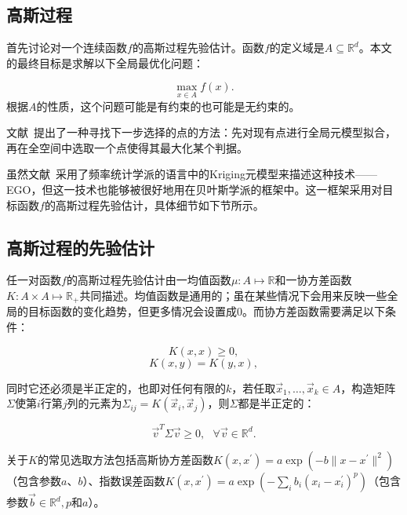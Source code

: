 \documentclass[index]{subfiles}
\begin{document}
\subsection{高斯过程}

首先讨论对一个连续函数$f$的高斯过程先验估计。函数$f$的定义域是$A \subseteq \mathbb{R}^{d}$。本文的最终目标是求解以下全局最优化问题：

\begin{equation}
\max_{x \in A} f(x).
\end{equation}
根据$A$的性质，这个问题可能是有约束的也可能是无约束的。

文献~提出了一种寻找下一步选择的点的方法：先对现有点进行全局元模型拟合，再在全空间中选取一个点使得其最大化某个判据。

虽然文献~采用了频率统计学派的语言中的Kriging元模型来描述这种技术——EGO，但这一技术也能够被很好地用在贝叶斯学派的框架中。这一框架采用对目标函数$f$的高斯过程先验估计，具体细节如下节所示。

\subsection{高斯过程的先验估计}

任一对函数$f$的高斯过程先验估计由一均值函数$\mu : A \mapsto \mathbb{R}$和一协方差函数$K : A \times A \mapsto \mathbb{R}_{+}$共同描述。均值函数是通用的；虽在某些情况下会用来反映一些全局的目标函数的变化趋势，但更多情况会设置成0。而协方差函数需要满足以下条件：

\begin{equation}K(x,x) \geq 0,\end{equation}
\begin{equation}K(x,y) = K(y,x),\end{equation}

同时它还必须是半正定的，也即对任何有限的$k$，若任取$\vec{x}_{1}, \ldots, \vec{x}_{k} \in A$，构造矩阵$\Sigma$使第$i$行第$j$列的元素为$\Sigma_{ij} = K(\vec{x}_{i}, \vec{x}_{j})$，则$\Sigma$都是半正定的：

\begin{equation}\vec{v}^{T}\Sigma \vec{v} \geq 0, \ \ \ \forall \vec{v} \in \mathbb{R}^{d}.\end{equation}

关于$K$的常见选取方法包括高斯协方差函数$K(x,x^{\prime}) = a \exp(-b \| x - x^{\prime}\|^{2})$（包含参数$a$、$b$）、指数误差函数$K(x, x^{\prime}) = a \exp(-\sum_{i} b_{i} (x_{i} - x_{i}^{\prime})^{p})$（包含参数$\vec{b} \in \mathbb{R}^{d}, p$和$a$）。
\end{document}

